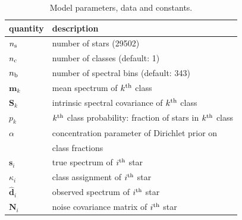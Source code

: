 \documentclass[a4paper,fleqn,usenatbib]{mnras}
\newcommand{\nb}{n_{\rm b}}
\newcommand{\nc}{n_{\rm c}}
\newcommand{\ns}{n_{\rm s}}
\newcommand{\specmean}{{\bm m}}
\newcommand{\speccov}{{\bm S}}
\newcommand{\classprob}{{p}}
\newcommand{\objspec}{{\bm s}}
\newcommand{\objclass}{{\kappa}}
\newcommand{\objdata}{\hat{\bm d}}
\newcommand{\objnoise}{{\bm N}}
\begin{document}
\begin{table}
    \centering
    \caption{Model parameters, data and constants.}
    \label{tab:params}
    \begin{tabular}{ll}
        \hline
        quantity & description \\
        \hline
        $\ns$ & number of stars (29502) \\
        $\nc$ & number of classes (default: 1) \\
        $\nb$ & number of spectral bins (default: 343) \\
        $\specmean_k$ & mean spectrum of $k^{\rm th}$ class \\
        $\speccov_k$ & intrinsic spectral covariance of $k^{\rm th}$ class \\
        $\classprob_k$ & $k^{\rm th}$ class probability: fraction of stars in $k^{\rm th}$ class \\
        $\alpha$ & concentration parameter of Dirichlet prior on \\
         & class fractions \\
        $\objspec_i$ & true spectrum of $i^{\rm th}$ star \\
        $\objclass_i$ & class assignment of $i^{\rm th}$ star \\
        $\objdata_i$ & observed spectrum of $i^{\rm th}$ star \\
        $\objnoise_i$ & noise covariance matrix of $i^{\rm th}$ star \\
        \hline
    \end{tabular}
\end{table}
\end{document}

